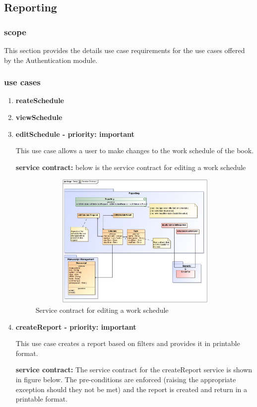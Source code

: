 \documentclass[12pt]{article}
\begin{document}
\subsection{Reporting}

\subsubsection{scope}
\par{This section provides the details use case requirements for the use cases offered by the Authentication
module.}

\subsubsection{use cases}

\begin{enumerate}
\item \textbf{reateSchedule}
\item \textbf{viewSchedule}
\item \textbf{editSchedule - priority: important}\\
\par{This use case allows a user to make changes to the work schedule of the book.}
\par{\textbf{service contract:} below is the service contract for editing a work schedule}

\begin{figure}[h]
\includegraphics[height=250px, width=500px]{epsImages/Reporting/editScheduleServiceContract.eps}
\caption{Service contract for editing a work schedule}
\end{figure}

\item \textbf{createReport - priority: important}\\
\par{This use case creates  a report based on filters and provides it in printable format.}\\
\par{\textbf{service contract:} The service contract for the createReport  service is shown in figure below. The pre-conditions are enforced (raising the appropriate exception should they not be met) and the report is created and return in a printable format.}


\end{enumerate}
\end{document}
